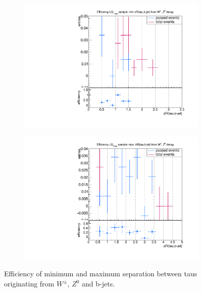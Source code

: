 \begin{figure}
\begin{subfigure}[t]{0.49\textwidth}
                \label{dRprompt:signal:taubjet:maxLQ75}
                \end{subfigure}
                \begin{subfigure}[t]{0.49\textwidth}
                \includegraphics[width=\textwidth]{figures/plots/LQ76/Divided_mindR_pr_taubjet.pdf}
                \label{dRprompt:signal:taubjet:minLQ76}
                \end{subfigure}
                \begin{subfigure}[t]{0.49\textwidth}
                \includegraphics[width=\textwidth]{figures/plots/LQ76/Divided_maxdR_pr_taubjet.pdf}
                \label{dRprompt:signal:taubjet:maxLQ76}
                \end{subfigure}
\caption[Efficiency of separation between taus originating from $W^\pm$, $Z^0$ and b-jets.]{Efficiency of minimum and maximum separation between taus originating from $W^\pm$, $Z^0$ and b-jets.}
\label{dRprompt:signal:taubjet}
\end{figure}

